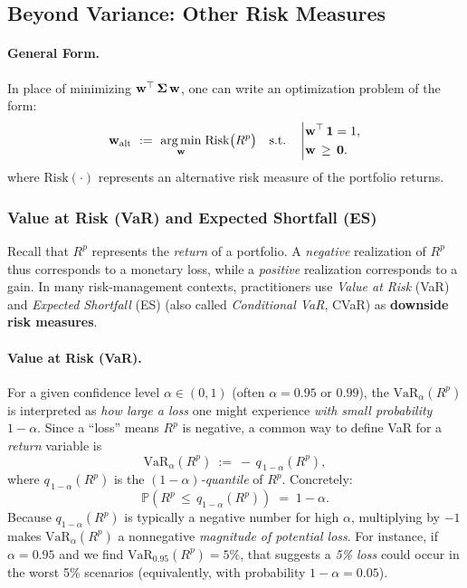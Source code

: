 \subsection{Beyond Variance: Other Risk Measures}

\paragraph{General Form.} In place of minimizing $\mathbf w^\top \,\mathbf \Sigma \,\mathbf w$, one can write an optimization problem of the form:
$$
\mathbf w_{\mathrm{alt}}
~:=~
\underset{\mathbf w}{\arg \min}
\;
\mathrm{Risk}\bigl(R^p\bigr)
\quad
\text{s.t.}
\quad
\left|
\begin{aligned}
& \mathbf w^\top \,\mathbf 1 = 1, \\
& \mathbf w \,\ge\, \mathbf 0.
\end{aligned}
\right.
$$
where $\mathrm{Risk}(\cdot)$ represents an alternative risk measure of the portfolio returns. 








\subsubsection{Value at Risk (VaR) and Expected Shortfall (ES)}
Recall that \(R^p\) represents the \emph{return} of a portfolio. A \emph{negative} realization of \(R^p\) thus corresponds to a monetary loss, while a \emph{positive} realization corresponds to a gain. In many risk-management contexts, practitioners use \emph{Value at Risk} (VaR) and \emph{Expected Shortfall} (ES) (also called \emph{Conditional VaR}, CVaR) as \textbf{downside risk measures}. 

\paragraph{Value at Risk (VaR).}
For a given confidence level \(\alpha \in (0,1)\) (often \(\alpha=0.95\) or \(0.99\)), the \(\text{VaR}_\alpha(R^p)\) is interpreted as \emph{how large a loss} one might experience \emph{with small probability} \(1-\alpha\). Since a ``loss'' means \(R^p\) is negative, a common way to define VaR for a \emph{return} variable is
$$
\mathrm{VaR}_{\alpha}(R^p) 
~:=~
-\,q_{\,1-\alpha}(R^p),
$$
where \(q_{\,1-\alpha}(R^p)\) is the \((1-\alpha)\)\emph{-quantile} of \(R^p\). Concretely:
\[
\mathbb{P}(R^p \,\le\, q_{1-\alpha}(R^p)) \;=\; 1-\alpha.
\]
Because \(q_{1-\alpha}(R^p)\) is typically a negative number for high \(\alpha\), multiplying by \(-1\) makes \(\mathrm{VaR}_\alpha(R^p)\) a nonnegative \emph{magnitude of potential loss}. For instance, if \(\alpha = 0.95\) and we find \(\mathrm{VaR}_{0.95}(R^p) = 5\%\), that suggests a \emph{5\% loss} could occur in the worst 5\% scenarios (equivalently, with probability \(1-\alpha=0.05\)).

